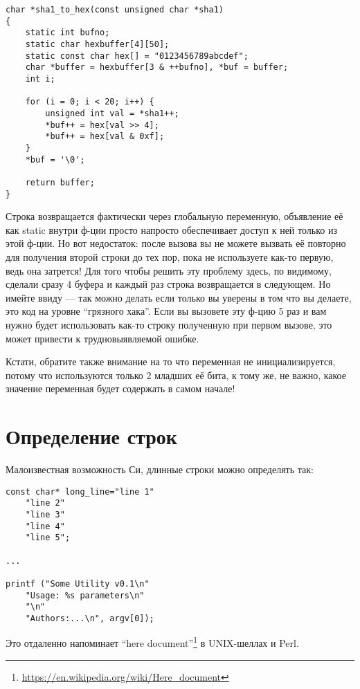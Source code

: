 \begin{lstlisting}
char *sha1_to_hex(const unsigned char *sha1)
{
	static int bufno;
	static char hexbuffer[4][50];
	static const char hex[] = "0123456789abcdef";
	char *buffer = hexbuffer[3 & ++bufno], *buf = buffer;
	int i;

	for (i = 0; i < 20; i++) {
		unsigned int val = *sha1++;
		*buf++ = hex[val >> 4];
		*buf++ = hex[val & 0xf];
	}
	*buf = '\0';

	return buffer;
}
\end{lstlisting}

Строка возвращается фактически через глобальную переменную, объявление её как static внутри ф-ции просто напросто
обеспечивает доступ к ней только из этой ф-ции. Но вот недостаток: после вызова  вы не можете
вызвать её повторно для получения второй строки до тех пор, пока не используете как-то первую, ведь она
затрется! Для того чтобы решить эту проблему здесь, по видимому, сделали сразу 4 буфера и каждый раз строка
возвращается в следующем. Но имейте ввиду --- так можно делать если только вы уверены в том что вы делаете,
это код на уровне ``грязного хака''.
Если вы
вызовете эту ф-цию 5 раз и вам нужно будет использовать как-то строку полученную при первом вызове, это может
привести к трудновыявляемой ошибке.

Кстати, обратите также внимание на то что переменная  не инициализируется, потому что используются только 
2 младших её бита, к тому же, не важно, какое значение переменная будет содержать в самом начале!

\section{Определение строк}

Малоизвестная возможность Си, длинные строки можно определять так:

\begin{lstlisting}
const char* long_line="line 1"
	"line 2"
	"line 3"
	"line 4"
	"line 5";

...

printf ("Some Utility v0.1\n"
	"Usage: %s parameters\n"
	"\n"
	"Authors:...\n", argv[0]);
\end{lstlisting}

Это отдаленно напоминает ``here document''\footnote{\url{https://en.wikipedia.org/wiki/Here_document}} в 
UNIX-шеллах и Perl.

